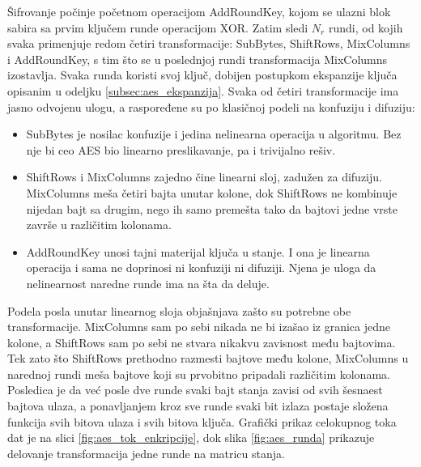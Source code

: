 Šifrovanje počinje početnom operacijom AddRoundKey, kojom se ulazni blok sabira sa prvim ključem runde operacijom XOR. Zatim sledi $N_r$ rundi, od kojih svaka primenjuje redom četiri transformacije: SubBytes, ShiftRows, MixColumns i AddRoundKey, s tim što se u poslednjoj rundi transformacija MixColumns izostavlja. Svaka runda koristi svoj ključ, dobijen postupkom ekspanzije ključa opisanim u odeljku \ref{subsec:aes_ekspanzija}.
\smallbreak
Svaka od četiri transformacije ima jasno odvojenu ulogu, a raspoređene su po klasičnoj podeli na konfuziju i difuziju:
\begin{itemize}[itemsep=2pt]
    \item SubBytes je nosilac konfuzije i jedina nelinearna operacija u algoritmu. Bez nje bi ceo AES bio linearno preslikavanje, pa i trivijalno rešiv.
    \item ShiftRows i MixColumns zajedno čine linearni sloj, zadužen za difuziju. MixColumns meša četiri bajta unutar kolone, dok ShiftRows ne kombinuje nijedan bajt sa drugim, nego ih samo premešta tako da bajtovi jedne vrste završe u različitim kolonama.
    \item AddRoundKey unosi tajni materijal ključa u stanje. I ona je linearna operacija i sama ne doprinosi ni konfuziji ni difuziji. Njena je uloga da nelinearnost naredne runde ima na šta da deluje.
\end{itemize}
Podela posla unutar linearnog sloja objašnjava zašto su potrebne obe transformacije. MixColumns sam po sebi nikada ne bi izašao iz granica jedne kolone, a ShiftRows sam po sebi ne stvara nikakvu zavisnost među bajtovima. Tek zato što ShiftRows prethodno razmesti bajtove među kolone, MixColumns u narednoj rundi meša bajtove koji su prvobitno pripadali različitim kolonama. Posledica je da već posle dve runde svaki bajt stanja zavisi od svih šesnaest bajtova ulaza, a ponavljanjem kroz sve runde svaki bit izlaza postaje složena funkcija svih bitova ulaza i svih bitova ključa.
Grafički prikaz celokupnog toka dat je na slici \ref{fig:aes_tok_enkripcije}, dok slika \ref{fig:aes_runda} prikazuje delovanje transformacija jedne runde na matricu stanja.

